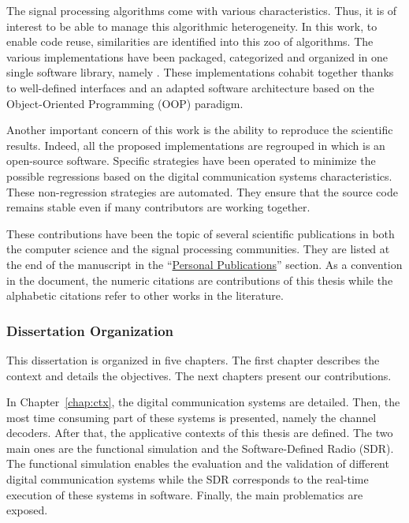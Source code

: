 The signal processing algorithms come with various characteristics. Thus, it is
of interest to be able to manage this algorithmic heterogeneity. In this work,
to enable code reuse, similarities are identified into this zoo of algorithms.
The various implementations have been packaged, categorized and organized in
one single software library, namely \AFFECT. These implementations cohabit
together thanks to well-defined interfaces and an adapted software architecture
based on the Object-Oriented Programming (OOP) paradigm.

Another important concern of this work is the ability to reproduce the
scientific results. Indeed, all the proposed implementations are regrouped in
\AFFECT which is an open-source software. Specific strategies have been operated
to minimize the possible regressions based on the digital communication systems
characteristics. These non-regression strategies are automated. They ensure that
the source code remains stable even if many contributors are working together.

These contributions have been the topic of several scientific publications in
both the computer science and the signal processing communities. They are listed
at the end of the manuscript in the
``\hyperref[chap:publi]{Personal Publications}'' section. As a convention in the
document, the numeric citations are contributions of this thesis while the
alphabetic citations refer to other works in the literature.

\subsubsection*{Dissertation Organization}

This dissertation is organized in five chapters. The first chapter describes the
context and details the objectives. The next chapters present our contributions.

In Chapter~\ref{chap:ctx}, the digital communication systems are detailed. Then,
the most time consuming part of these systems is presented, namely the channel
decoders. After that, the applicative contexts of this thesis are defined. The
two main ones are the functional simulation and the Software-Defined Radio
(SDR). The functional simulation enables the evaluation and the validation of
different digital communication systems while the SDR corresponds to the
real-time execution of these systems in software. Finally, the main problematics
are exposed.

